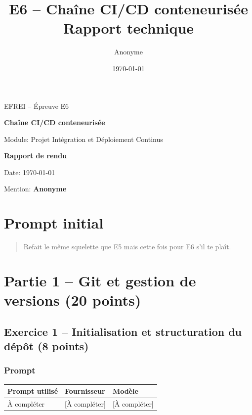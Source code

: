 \documentclass[11pt,a4paper]{article}
\title{E6 -- Chaîne CI/CD conteneurisée\\\large Rapport technique}
\author{Anonyme}
\date{\today}
\begin{document}
\begin{titlepage}
    \centering
    {\Large EFREI -- Épreuve E6\par}
    \vspace{0.6cm}
    {\LARGE \textbf{Chaîne CI/CD conteneurisée}\par}
    \vspace{0.4cm}
    {\large Module: Projet Intégration et Déploiement Continus\par}
    \vspace{1.2cm}
    {\Large \textbf{Rapport de rendu}\par}
    \vfill
    {\large Date: \today\par}
    \vspace{0.3cm}
    {\large Mention: \textbf{Anonyme}\par}
\end{titlepage}

\tableofcontents
\newpage

\section*{Prompt initial}
\begin{quote}
Refait le même squelette que E5 mais cette fois pour E6 s'il te plaît.
\end{quote}

\newpage
\section{Partie 1 -- Git et gestion de versions (20 points)}

\subsection{Exercice 1 -- Initialisation et structuration du dépôt (8 points)}
\subsubsection*{Prompt}
\begin{longtable}{p{}p{}p{}}
\toprule
Prompt utilisé & Fournisseur & Modèle \\
\midrule
À compléter & [À compléter] & [À compléter] \\
\bottomrule
\end{longtable}
\end{document}
